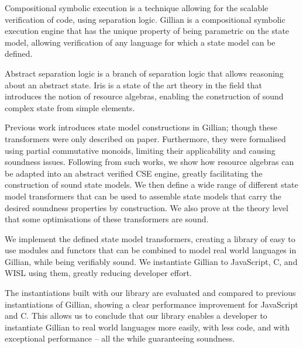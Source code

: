 Compositional symbolic execution is a technique allowing for the scalable verification of code, using separation logic. Gillian is a compositional symbolic execution engine that has the unique property of being parametric on the state model, allowing verification of any language for which a state model can be defined.

Abstract separation logic is a branch of separation logic that allows reasoning about an abstract state. Iris is a state of the art theory in the field that introduces the notion of resource algebras, enabling the construction of sound complex state from simple elements.

Previous work introduces state model constructions in Gillian; though these transformers were only described on paper. Furthermore, they were formalised using partial commutative monoids, limiting their applicability and causing soundness issues. Following from such works, we show how resource algebras can be adapted into an abstract verified CSE engine, greatly facilitating the construction of sound state models. We then define a wide range of different state model transformers that can be used to assemble state models that carry the desired soundness properties by construction. We also prove at the theory level that some optimisations of these transformers are sound.

We implement the defined state model transformers, creating a library of easy to use modules and functors that can be combined to model real world languages in Gillian, while being verifiably sound. We instantiate Gillian to JavaScript, C, and WISL using them, greatly reducing developer effort.

The instantiations built with our library are evaluated and compared to previous instantiations of Gillian, showing a clear performance improvement for JavaScript and C. This allows us to conclude that our library enables a developer to instantiate Gillian to real world languages more easily, with less code, and with exceptional performance -- all the while guaranteeing soundness.